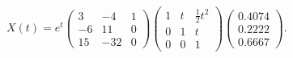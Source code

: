 \ans $X(t) = e^t\left(\begin{array}{rrr}
     3  &  -4   &   1\\
    -6   &  11   &   0\\
    15   & -32   &   0 \end{array}\right)
\left(\begin{array}{rrr}
     1  &  t   &   \frac{1}{2}t^2\\
    0   &  1   &   t\\
    0   &  0   &   1 \end{array}\right)
\left(\begin{array}{r} 0.4074\\ 0.2222\\ 0.6667\end{array}\right)$.

\vspace{0.08in}

